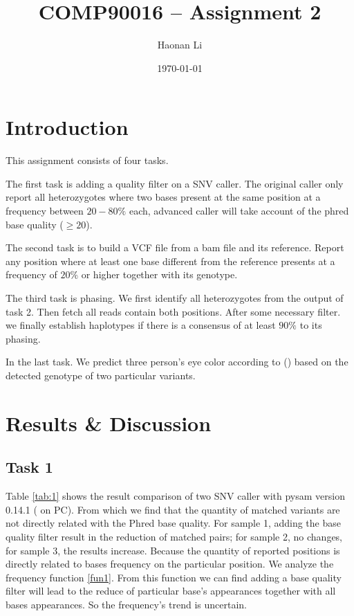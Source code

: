 \documentclass[a4paper]{article}
\title{\bfseries{COMP90016 -- Assignment 2 }}
\author{Haonan Li}
\date{\today}
\begin{document}
\maketitle

\section{Introduction}
\label{sec:introduction}

This assignment consists of four tasks. 

The first task is adding a quality filter on a SNV caller. The original caller only report all heterozygotes where two bases present at the same position at a frequency between $20-80\%$ each, advanced caller will take account of the phred base quality ($\geq 20$).

The second task is to build a VCF file from a bam file and its reference. Report any position where at least one base different from the reference presents at a frequency of $20\%$ or higher together with its genotype.

The third task is phasing. We first identify all heterozygotes from the output of task 2. Then fetch all reads contain both positions. After some necessary filter. we finally establish haplotypes if there is a consensus of at least $90\%$ to its phasing. 

In the last task. We predict three person's eye color according to (\cite{Sturm2008A}) based on the detected genotype of two particular variants.

\section{Results \& Discussion}
\label{sec:experiment}
\subsection{Task 1}

Table \ref{tab:1} shows the result comparison of two SNV caller with pysam version 0.14.1 ( on PC). From which we find that the quantity of matched variants are not directly related with the Phred base quality. For sample 1, adding the base quality filter result in the reduction of matched pairs; for sample 2, no changes, for sample 3, the results increase. Because the quantity of reported positions is directly related to bases frequency on the particular position. We analyze the frequency function \ref{fun1}. From this function we can find adding a base quality filter will lead to the reduce of particular base's appearances together with all bases appearances. So the frequency's trend is uncertain.
\end{document}
